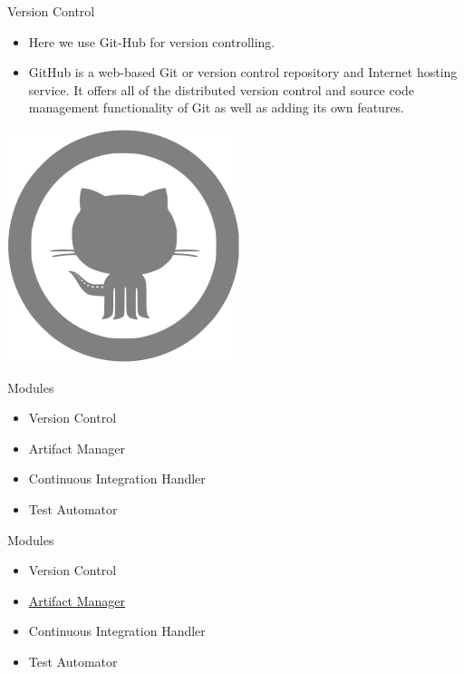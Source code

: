 \documentclass{beamer}
\begin{document}
\begin{frame}{Version Control}
	\begin{itemize}
		\item Here we use Git-Hub for version controlling.
		\vspace{0.5 cm}
		\item GitHub is a web-based Git or version control repository and Internet hosting service. It offers all of the distributed version control and source code management functionality of Git as well as adding its own features.
	\end{itemize}
\includegraphics[scale=0.2]{github.png}
\end{frame}
\begin{frame}{Modules}
\begin{itemize}
\item Version Control
\item Artifact Manager
\item Continuous Integration Handler
\item Test Automator

\end{itemize}

\end{frame}

\begin{frame}{Modules}
\begin{itemize}
\item Version Control
\item \underline{Artifact Manager}
\item Continuous Integration Handler
\item Test Automator

\end{itemize}

\end{frame}
\end{document}
